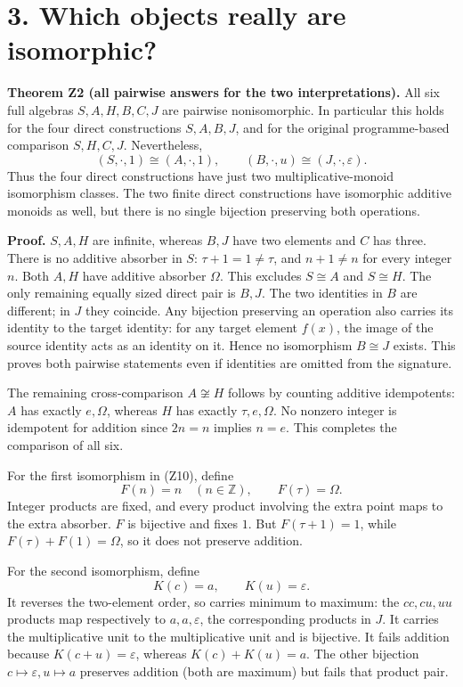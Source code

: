 \documentclass[
]{article}
\begin{document}
\section{3. Which objects really are
isomorphic?}\label{which-objects-really-are-isomorphic}

\textbf{Theorem Z2 (all pairwise answers for the two interpretations).}
All six full algebras \(S,A,H,B,C,J\) are pairwise nonisomorphic. In
particular this holds for the four direct constructions \(S,A,B,J\), and
for the original programme-based comparison \(S,H,C,J\). Nevertheless,
\[
(S,\cdot,1)\cong(A,\cdot,1),
\qquad
(B,\cdot,u)\cong(J,\cdot,\varepsilon).
\tag{Z10}
\] Thus the four direct constructions have just two
multiplicative-monoid isomorphism classes. The two finite direct
constructions have isomorphic additive monoids as well, but there is no
single bijection preserving both operations.

\textbf{Proof.} \(S,A,H\) are infinite, whereas \(B,J\) have two
elements and \(C\) has three. There is no additive absorber in \(S\):
\(\tau+1=1\ne\tau\), and \(n+1\ne n\) for every integer \(n\). Both
\(A,H\) have additive absorber \(\Omega\). This excludes \(S\cong A\)
and \(S\cong H\). The only remaining equally sized direct pair is
\(B,J\). The two identities in \(B\) are different; in \(J\) they
coincide. Any bijection preserving an operation also carries its
identity to the target identity: for any target element \(f(x)\), the
image of the source identity acts as an identity on it. Hence no
isomorphism \(B\cong J\) exists. This proves both pairwise statements
even if identities are omitted from the signature.

The remaining cross-comparison \(A\not\cong H\) follows by counting
additive idempotents: \(A\) has exactly \(e,\Omega\), whereas \(H\) has
exactly \(\tau,e,\Omega\). No nonzero integer is idempotent for addition
since \(2n=n\) implies \(n=e\). This completes the comparison of all
six.

For the first isomorphism in (Z10), define \[
F(n)=n\quad(n\in\mathbb Z),\qquad F(\tau)=\Omega.
\tag{Z11}
\] Integer products are fixed, and every product involving the extra
point maps to the extra absorber. \(F\) is bijective and fixes \(1\).
But \(F(\tau+1)=1\), while \(F(\tau)+F(1)=\Omega\), so it does not
preserve addition.

For the second isomorphism, define \[
K(c)=a,\qquad K(u)=\varepsilon.
\tag{Z12}
\] It reverses the two-element order, so carries minimum to maximum: the
\(cc,cu,uu\) products map respectively to \(a,a,\varepsilon\), the
corresponding products in \(J\). It carries the multiplicative unit to
the multiplicative unit and is bijective. It fails addition because
\(K(c+u)=\varepsilon\), whereas \(K(c)+K(u)=a\). The other bijection
\(c\mapsto\varepsilon,u\mapsto a\) preserves addition (both are maximum)
but fails that product pair.
\end{document}
